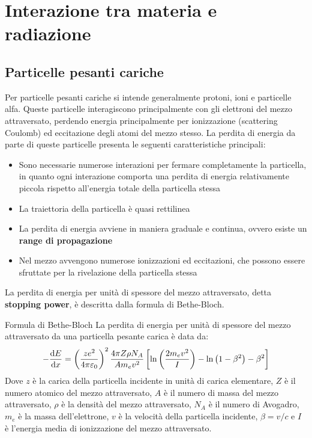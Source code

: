 \chapter[Interazione con la materia]{Interazione tra materia e radiazione}
\section{Particelle pesanti cariche}
Per particelle pesanti cariche si intende generalmente protoni, ioni e particelle alfa. Queste particelle interagiscono principalmente con gli elettroni del mezzo attraversato, perdendo energia principalmente per ionizzazione (scattering Coulomb) ed eccitazione degli atomi del mezzo stesso. La perdita di energia da parte di queste particelle presenta le seguenti caratteristiche principali:
\begin{itemize}
    \item Sono necessarie numerose interazioni per fermare completamente la particella, in quanto ogni interazione comporta una perdita di energia relativamente piccola rispetto all'energia totale della particella stessa
    \item La traiettoria della particella è quasi rettilinea
    \item La perdita di energia avviene in maniera graduale e continua, ovvero esiste un \textbf{range di propagazione}
    \item Nel mezzo avvengono numerose ionizzazioni ed eccitazioni, che possono essere sfruttate per la rivelazione della particella stessa
\end{itemize}
La perdita di energia per unità di spessore del mezzo attraversato, detta \textbf{stopping power}, è descritta dalla formula di Bethe-Bloch.
\begin{theorem}{Formula di Bethe-Bloch}
    La perdita di energia per unità di spessore del mezzo attraversato da una particella pesante carica è data da:
    \begin{equation}
        -\dv{E}{x} = \brackets{\dfrac{ze^2}{4\pi\varepsilon_0}}^2 \dfrac{4\pi Z \rho N_A}{A m_e v^2}\sqbr{\ln\brackets{\dfrac{2 m_e v^2}{I}} - \ln\brackets{1 - \beta^2} - \beta^2}
    \end{equation}
    Dove $z$ è la carica della particella incidente in unità di carica elementare, $Z$ è il numero atomico del mezzo attraversato, $A$ è il numero di massa del mezzo attraversato, $\rho$ è la densità del mezzo attraversato, $N_A$ è il numero di Avogadro, $m_e$ è la massa dell'elettrone, $v$ è la velocità della particella incidente, $\beta = v/c$ e $I$ è l'energia media di ionizzazione del mezzo attraversato.
\end{theorem}

